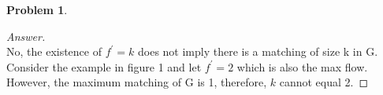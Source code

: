 \documentclass[11pt]{article}
\theoremstyle{definition}
\theoremstyle{definition}
\newtheorem{required}{Problem}
\theoremstyle{definition}
\begin{document}
\begin{required}
\begin{enumerate}[label=(\alph*)]
\begin{proof}[Answer] $ $ \\
No, the existence of $f^{\prime} = k$ does not imply there is a matching of size k in G. Consider the example in figure 1 and let $f^{\prime} = 2$ which is also the max flow. However, the maximum matching of G is 1, therefore, $k$ cannot equal 2. 
\end{proof}


\end{enumerate}
\end{required}

\end{document}
